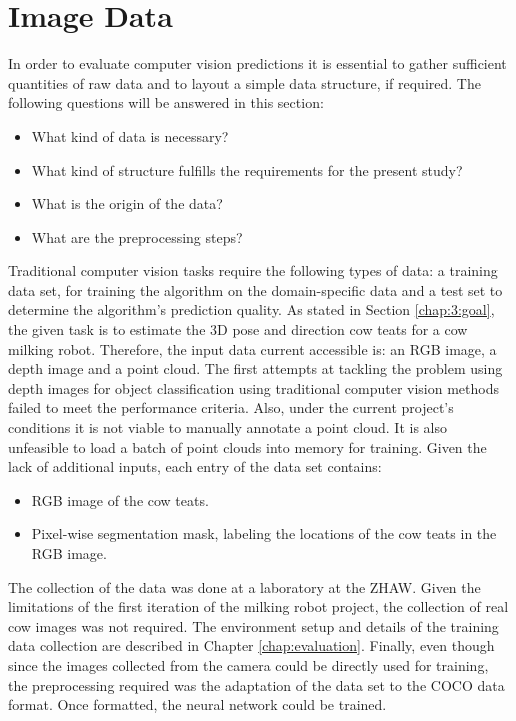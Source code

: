 \section{Image Data}\label{chap:3:data}
In order to evaluate computer vision predictions it is essential to gather sufficient quantities of raw data and to layout a simple data structure, if required. The following questions will be answered in this section:
\begin{itemize}
    \item What kind of data is necessary?
    \item What kind of structure fulfills the requirements for the present study?
    \item What is the origin of the data?
    \item What are the preprocessing steps?
\end{itemize}
Traditional computer vision tasks require the following types of data: a training data set, for training the algorithm on the domain-specific data and a test set to determine the algorithm's prediction quality. As stated in Section \ref{chap:3:goal}, the given task is to estimate the 3D pose and direction cow teats for a cow milking robot. Therefore, the input data current accessible is: an RGB image, a depth image and a point cloud. The first attempts at tackling the problem using depth images for object classification using traditional computer vision methods failed to meet the performance criteria. Also, under the current project's conditions it is not viable to manually annotate a point cloud. It is also unfeasible to load a batch of point clouds into memory for training. Given the lack of additional inputs, each entry of the data set contains:
\begin{itemize}
    \item RGB image of the cow teats.
    \item Pixel-wise segmentation mask, labeling the locations of the cow teats in the RGB image.
\end{itemize}
The collection of the data was done at a laboratory at the ZHAW. Given the limitations of the first iteration of the milking robot project, the collection of real cow images was not required. The environment setup and details of the training data collection are described in Chapter \ref{chap:evaluation}. Finally, even though since the images collected from the camera could be directly used for training, the preprocessing required was the adaptation of the data set to the COCO data format. Once formatted, the neural network could be trained.


